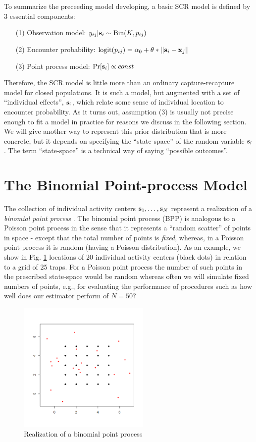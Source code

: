 To summarize the preceeding model developing, a basic SCR model is
defined by 3 essential components:
\begin{itemize}
\item[(1)] Observation model: $y_{ij}|{\bf s}_{i} \sim \mbox{Bin}(K, p_{ij})$
\item[(2)] Encounter probability: $\mbox{logit}(p_{ij}) = \alpha_{0} +
  \theta*||{\bf s}_{i}-{\bf x}_{j}||$
\item[(3)] Point process model: $\Pr[{\bf s}_{i} ] \propto const$	
\end{itemize}			
Therefore, the SCR model is little more than an ordinary
capture-recapture model for closed populations. It is such a model,
but augmented with a set of ``individual effects'', ${\bf s}_{i}$,
which relate some sense of individual location to encounter
probability.  As it turns out, assumption (3) is usually not precise
enough to fit a model in practice for reasons we discuss in the
following section.  We will give another way to represent this prior
distribution that is more concrete, but it depends on specifying the
``state-space'' of the random variable ${\bf s}_{i}$. The term
``state-space'' is a technical way of saying ``possible outcomes''.


\section{ The Binomial Point-process Model}
The collection of individual activity centers ${\bf s}_{1},\ldots,
{\bf s}_{N}$
represent a realization of a {\it binomial point process} 
\citep[][p. xyz]{illian_etal:2008}.  The binomial point process (BPP)
is analogous to a Poisson point process in the sense that it
represents a ``random scatter'' of points in space - except that the
total number of points is {\it fixed}, whereas, in a Poisson point
process it is random (having a Poisson distribution).  As an example,
we show in Fig. \ref{scr0.fig.bpp} 
locations of 20 individual activity centers
(black dots) in relation to a grid of 25 traps. For a Poisson point
process the number of such points in the prescribed state-space would
be random whereas often we will simulate fixed numbers of points,
e.g., for evaluating the performance of procedures such as how well
does our estimator perform of $N=50$? \begin{figure}
\begin{center}
\includegraphics[height=2.5in]{figs/binomialpoint}
\end{center}
\caption{Realization of a binomial point process}
\label{scr0.fig.bpp}
\end{figure}

